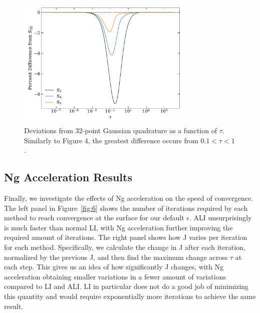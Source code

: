 \documentclass[12pt]{article}
\begin{document}
\begin{figure}[ht]
 \centering
 \includegraphics[width=0.75\textwidth]{quadrature.pdf}
 \caption{Deviations from 32-point Gaussian quadrature as a function of $\tau$. Similarly to Figure 4, the greatest difference occurs from $0.1 < \tau < 1$. }
 \label{fig:5}
\end{figure}

\subsection{Ng Acceleration Results}

Finally, we investigate the effects of Ng acceleration on the speed of convergence. The left panel in Figure~\ref{fig:6} shows the number of iterations required by each method to reach convergence at the surface for our default $\epsilon$. ALI unsurprisingly is much faster than normal LI, with Ng acceleration further improving the required amount of iterations. The right panel shows how J varies per iteration for each method. Specifically, we calculate the change in J after each iteration, normalized by the previous J, and then find the maximum change across $\tau$ at each step. This gives us an idea of how significantly J changes, with Ng acceleration obtaining smaller variations in a fewer amount of variations compared to LI and ALI. LI in particular does not do a good job of minimizing this quantity and would require exponentially more iterations to achieve the same result.
\end{document}
